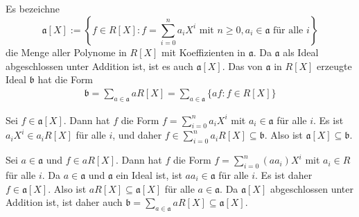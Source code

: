\documentclass[a4paper,10pt]{article}
\theoremstyle{definition}
\newcommand{\mf}[1]{\mathfrak{#1}}
\begin{document}
\subsection{}
Es bezeichne
\[
 \mf{a}[X] := \left\{f \in R[X] : f = \sum_{i=0}^n a_i X^i \text{ mit } n \geq 0, a_i \in \mf{a} \text{ für alle } i\right\}
\]
die Menge aller Polynome in $R[X]$ mit Koeffizienten in $\mf{a}$. Da $\mf{a}$ als Ideal abgeschlossen unter Addition ist, ist es auch $\mf{a}[X]$. Das von $\mf{a}$ in $R[X]$ erzeugte Ideal $\mf{b}$ hat die Form
\begin{align*}
 \mf{b} = \sum_{a \in \mf{a}} aR[X] = \sum_{a \in \mf{a}} \{af : f \in R[X] \}
\end{align*}

Sei $f \in \mf{a}[X]$. Dann hat $f$ die Form $f = \sum_{i=0}^n a_i X^i$ mit $a_i \in \mf{a}$ für alle $i$. Es ist $a_i X^i \in a_i R[X]$ für alle $i$, und daher $f \in \sum_{i=0}^n a_i R[X] \subseteq \mf{b}$. Also ist $\mf{a}[X] \subseteq \mf{b}$.

Sei $a \in \mf{a}$ und $f \in aR[X]$. Dann hat $f$ die Form $f = \sum_{i=0}^n (a a_i) X^i$ mit $a_i \in R$ für alle $i$. Da $a \in \mf{a}$ und $\mf{a}$ ein Ideal ist, ist $a a_i \in \mf{a}$ für alle $i$. Es ist daher $f \in \mf{a}[X]$. Also ist $aR[X] \subseteq \mf{a}[X]$ für alle $a \in \mf{a}$. Da $\mf{a}[X]$ abgeschlossen unter Addition ist, ist daher auch $\mf{b} = \sum_{a \in \mf{a}} aR[X] \subseteq \mf{a}[X]$.


\subsection{}
\end{document}
